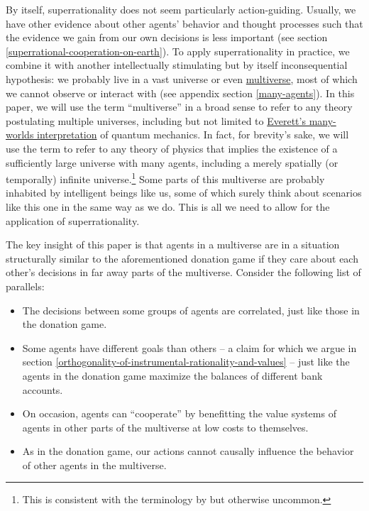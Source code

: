 By itself, superrationality does not seem particularly action-guiding.
Usually, we have other evidence about other agents' behavior and thought
processes such that the evidence we gain from our own decisions is less
important (see section
\ref{superrational-cooperation-on-earth}). To apply superrationality in practice, we
combine it with another intellectually stimulating but by itself
inconsequential hypothesis: we probably live in a vast universe or even
\href{https://en.wikipedia.org/wiki/Multiverse}{multiverse}, most
of which we cannot observe or interact with (see appendix section
\ref{many-agents}). In this paper,
we will use the term ``multiverse'' in a broad sense to refer to any
theory postulating multiple universes, including but not limited to
\href{https://en.wikipedia.org/wiki/Many-worlds_interpretation}{Everett's
many-worlds interpretation} of quantum mechanics. In fact, for
brevity's sake, we will use the term to refer to any theory of physics
that implies the existence of a sufficiently large universe with many
agents, including a merely spatially (or temporally) infinite
universe.\footnote{This is consistent with the terminology by 
  \citet{Tegmark2003-sl} but otherwise
  uncommon.} Some parts of this multiverse are probably inhabited by
intelligent beings like us, some of which surely think about scenarios
like this one in the same way as we do. This is all we need to allow for
the application of superrationality.

The key insight of this paper is that agents in a multiverse are in a
situation structurally similar to the aforementioned donation game if
they care about each other's decisions in far away parts of the
multiverse. Consider the following list of parallels:

\begin{itemize}
\item
  The decisions between some groups of agents are correlated, just like
  those in the donation game.
\item
  Some agents have different goals than others -- a claim for which we
  argue in section
  \ref{orthogonality-of-instrumental-rationality-and-values} -- just like the agents in
  the donation game maximize the balances of different bank accounts.
\item
  On occasion, agents can ``cooperate'' by benefitting the value systems
  of agents in other parts of the multiverse at low costs to themselves.
\item
  As in the donation game, our actions cannot causally influence the
  behavior of other agents in the multiverse.
\end{itemize}

